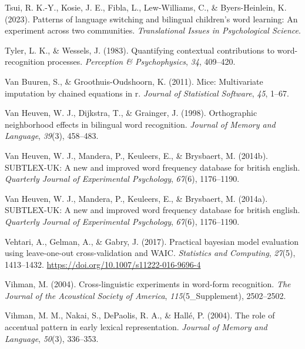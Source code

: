 \documentclass[
  12pt,
  b5paperpaper,
  twoside]{scrreprt}
\newlength{\cslhangindent}
\newlength{\cslentryspacingunit} %
\newenvironment{CSLReferences}[2] %
 {%
  \setlength{\parindent}{0pt}
  \ifodd #1
  \let\oldpar\par
  \def\par{\hangindent=\cslhangindent\oldpar}
  \fi
  \setlength{\parskip}{#2\cslentryspacingunit}
 }%
 {}
\begin{document}
\begin{CSLReferences}{1}{0}
\leavevmode{}%
Tsui, R. K.-Y., Kosie, J. E., Fibla, L., Lew-Williams, C., \&
Byers-Heinlein, K. (2023). Patterns of language switching and bilingual
children's word learning: An experiment across two communities.
\emph{Translational Issues in Psychological Science}.

\leavevmode{}%
Tyler, L. K., \& Wessels, J. (1983). Quantifying contextual
contributions to word-recognition processes. \emph{Perception \&
Psychophysics}, \emph{34}, 409--420.

\leavevmode{}%
Van Buuren, S., \& Groothuis-Oudshoorn, K. (2011). Mice: Multivariate
imputation by chained equations in r. \emph{Journal of Statistical
Software}, \emph{45}, 1--67.

\leavevmode{}%
Van Heuven, W. J., Dijkstra, T., \& Grainger, J. (1998). Orthographic
neighborhood effects in bilingual word recognition. \emph{Journal of
Memory and Language}, \emph{39}(3), 458--483.

\leavevmode{}%
Van Heuven, W. J., Mandera, P., Keuleers, E., \& Brysbaert, M. (2014b).
SUBTLEX-UK: A new and improved word frequency database for british
english. \emph{Quarterly Journal of Experimental Psychology},
\emph{67}(6), 1176--1190.

\leavevmode{}%
Van Heuven, W. J., Mandera, P., Keuleers, E., \& Brysbaert, M. (2014a).
{SUBTLEX}-{UK}: A new and improved word frequency database for british
english. \emph{Quarterly Journal of Experimental Psychology},
\emph{67}(6), 1176--1190.

\leavevmode{}%
Vehtari, A., Gelman, A., \& Gabry, J. (2017). Practical bayesian model
evaluation using leave-one-out cross-validation and {WAIC}.
\emph{Statistics and Computing}, \emph{27}(5), 1413--1432.
\url{https://doi.org/10.1007/s11222-016-9696-4}

\leavevmode{}%
Vihman, M. (2004). Cross-linguistic experiments in word-form
recognition. \emph{The Journal of the Acoustical Society of America},
\emph{115}(5\_Supplement), 2502--2502.

\leavevmode{}%
Vihman, M. M., Nakai, S., DePaolis, R. A., \& Hallé, P. (2004). The role
of accentual pattern in early lexical representation. \emph{Journal of
Memory and Language}, \emph{50}(3), 336--353.


\end{CSLReferences}
\end{document}
